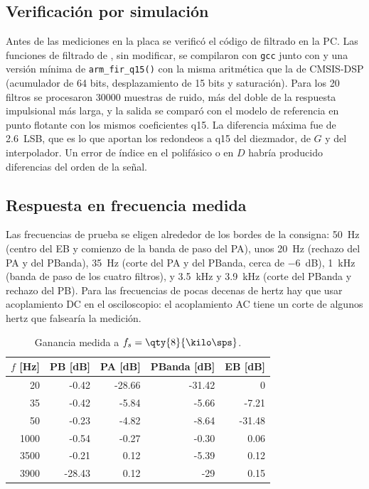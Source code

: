 \documentclass[11pt,a4paper]{article}
\begin{document}
\subsection{Verificación por simulación}

Antes de las mediciones en la placa se verificó el código de filtrado en la
PC. Las funciones de filtrado de , sin modificar, se
compilaron con \texttt{gcc} junto con  y una
versión mínima de \texttt{arm\_fir\_q15()} con la misma aritmética que la de
CMSIS-DSP (acumulador de 64 bits, desplazamiento de 15 bits y saturación).
Para los 20 filtros se procesaron \num{30000} muestras de ruido, más del
doble de la respuesta impulsional más larga, y la salida se comparó con el
modelo de referencia en punto flotante con los mismos coeficientes q15. La
diferencia máxima fue de \num{2.6}~LSB, que es lo que aportan los redondeos
a q15 del diezmador, de $G$ y del interpolador. Un error de índice en el
polifásico o en $D$ habría producido diferencias del orden de la señal.

\subsection{Respuesta en frecuencia medida}

Las frecuencias de prueba se eligen alrededor de los bordes de la consigna:
\qty{50}{\hertz} (centro del EB y comienzo de la banda de paso del PA), unos
\qty{20}{\hertz} (rechazo del PA y del PBanda), \qty{35}{\hertz} (corte del
PA y del PBanda, cerca de \qty{-6}{\deci\bel}), \qty{1}{\kilo\hertz} (banda
de paso de los cuatro filtros), y \qty{3.5}{\kilo\hertz} y
\qty{3.9}{\kilo\hertz} (corte del PBanda y rechazo del PB). Para las frecuencias de
pocas decenas de hertz hay que usar acoplamiento DC en el osciloscopio: el
acoplamiento AC tiene un corte de algunos hertz que falsearía la medición.

\begin{table}[H]
\centering
\caption{Ganancia medida a $f_s = \qty{8}{\kilo\sps}$.}
\label{tab:respuesta}
\begin{tabular}{@{}r r r r r@{}}
\toprule
\textbf{$f$ [Hz]} & \textbf{PB [dB]} & \textbf{PA [dB]} &
\textbf{PBanda [dB]} & \textbf{EB [dB]}\\
\midrule
\num{20}   & -0.42 & -28.66 & -31.42 & 0\\
\num{35}   & -0.42 & -5.84 & -5.66 & -7.21\\
\num{50}   & -0.23 & -4.82 & -8.64 & -31.48\\
\num{1000} & -0.54 & -0.27 & -0.30 & 0.06\\
\num{3500} & -0.21 & 0.12 & -5.39 & 0.12\\
\num{3900} & -28.43 & 0.12 & -29 & 0.15\\
\bottomrule
\end{tabular}
\end{table}
\end{document}
